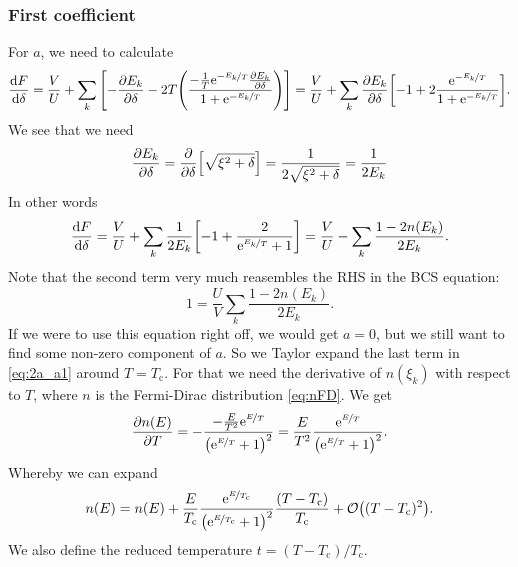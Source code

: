 \documentclass[11pt,letter, swedish, english
]{article}
\newcommand{\Tc}{\ensuremath{T_{\text{c}}}}
\begin{document}
\subsubsection{First coefficient}
For $a$, we need to calculate
\begin{equation}\label{eq:2a_dF/ddelta}
\dv{F}{\delta}=\frac{V}{U}
+\sum_k\qty[-\pdv{E_k}{\delta}
-2T\qty(\frac{-\frac{1}{T}\mathrm{e}^{-\nicefrac{E_k}{T}}\pdv{E_k}{\delta}}
{1+\mathrm{e}^{-\nicefrac{E_k}{T}}})]
=\frac{V}{U}
+\sum_k\pdv{E_k}{\delta}\qty[-1
+2\frac{\mathrm{e}^{-\nicefrac{E_k}{T}}}{1+\mathrm{e}^{-\nicefrac{E_k}{T}}}].
\end{equation}
We see that we need
\begin{equation}\label{eq:2a_dEk/ddelta}
\pdv{E_k}{\delta}=\pdv{\delta}\qty[\sqrt{\xi^2+\delta}]
=\frac{1}{2\sqrt{\xi^2+\delta}}=\frac{1}{2E_k}
\end{equation}
In other words
\begin{equation}\label{eq:2a_a1}
\dv{F}{\delta}
=\frac{V}{U}
+\sum_k\frac{1}{2E_k}\qty[-1
+\frac{2}{\mathrm{e}^{\nicefrac{E_k}{T}}+1}]
=\frac{V}{U}
-\sum_k\frac{1-2n(E_k)}{2E_k}.
\end{equation}
Note that the second term very much reasembles the RHS in the BCS
equation:
\begin{equation}
1=\frac{U}{V}\sum_k\frac{1-2n(E_k)}{2E_k}.
\end{equation}
If we were to use this equation right off, we would get $a=0$, but we
still want to find some non-zero component of $a$. So we Taylor expand
the last term in \eqref{eq:2a_a1} around $T=\Tc$.
For that we need the
derivative of $n(\xi_k)$ with respect to $T$, where $n$ is the
Fermi-Dirac distribution \eqref{eq:nFD}. We get
\begin{equation}
\pdv{n(E)}{T}=-\frac{-\frac{E}{T^2}\mathrm{e}^{\nicefrac{E}{T}}}{\qty(\mathrm{e}^{\nicefrac{E}{T}}+1)^2}
=\frac{E}{T^2}\frac{\mathrm{e}^{\nicefrac{E}{T}}}{\qty(\mathrm{e}^{\nicefrac{E}{T}}+1)^2}.
\end{equation}
Whereby we can expand
\begin{equation}
n(E)=n(E) %
+\frac{E}{\Tc}\frac{\ee^{\nicefrac{E}{\Tc}}}
{\qty(\ee^{\nicefrac{E}{\Tc}}+1)^2}
\frac{(T-\Tc)}{\Tc} + \order{(T-\Tc)^2}.
\end{equation}
We also define the reduced temperature $t=(T-\Tc)/\Tc$.
\end{document}
